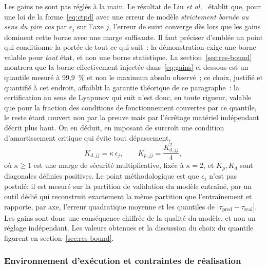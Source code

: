 \documentclass[a4paper, oneside]{article}
\newcommand{\taupred}{\ensuremath{\tau_{\mathrm{pred}}}}
\newcommand{\taureal}{\ensuremath{\tau_{\mathrm{real}}}}
\begin{document}
Les gains ne sont pas réglés à la main. Le résultat de
Liu \emph{et al.}~\cite{liu2024} établit que, pour une loi de la
forme~\eqref{eq:ctpd} avec une erreur de modèle \emph{strictement bornée au
sens du pire cas} par $\epsilon_j$ sur l'axe $j$, l'erreur de suivi converge
dès lors que les gains dominent cette borne avec une marge suffisante. Il faut
préciser d'emblée un point qui conditionne la portée de tout ce qui suit~: la
démonstration exige une borne valable pour \emph{tout} état, et non une borne
statistique. La section~\ref{sec:res-bound} montrera que la borne effectivement
injectée dans~\eqref{eq:gains} ci-dessous est un quantile mesuré à 99,9~\% et
non le maximum absolu observé~; ce choix, justifié et quantifié à cet endroit,
affaiblit la garantie théorique de ce paragraphe~: la certification au sens de
Lyapunov qui suit n'est donc, en toute rigueur, valable que pour la fraction
des conditions de fonctionnement couvertes par ce quantile, le reste étant
couvert non par la preuve mais par l'écrêtage matériel indépendant décrit plus
haut. On en déduit, en imposant de surcroît une condition d'amortissement
critique qui évite tout dépassement,
%
\begin{equation}
    K_{d,jj} = \kappa\,\epsilon_j , \qquad
    K_{p,jj} = \frac{K_{d,jj}^{2}}{4} ,
    \label{eq:gains}
\end{equation}
%
où $\kappa \ge 1$ est une marge de sécurité multiplicative, fixée à
$\kappa = 2$, et $K_p, K_d$ sont diagonales définies positives. Le point
méthodologique est que $\epsilon_j$ n'est pas postulé: il est mesuré sur la
partition de validation du modèle entraîné, par un outil dédié qui reconstruit
exactement la même partition que l'entraînement et rapporte, par axe, l'erreur
quadratique moyenne et les quantiles de $|\taupred - \taureal|$. Les gains sont
donc une conséquence chiffrée de la qualité du modèle, et non un réglage
indépendant. Les valeurs obtenues et la discussion du choix du quantile figurent
en section~\ref{sec:res-bound}.

\subsubsection{Environnement d'exécution et contraintes de réalisation}
\label{sec:exec}
\end{document}
